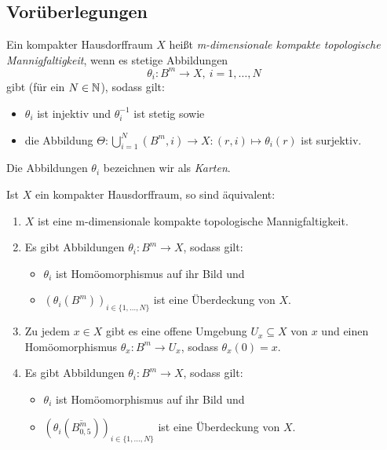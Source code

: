 \subsection{Vorüberlegungen}

\begin{defn}\label{defn:TopMan}
Ein kompakter Hausdorffraum $X$ heißt \emph{m-dimensionale kompakte topologische Mannigfaltigkeit}, wenn es stetige Abbildungen
\[ \theta_i: B^m \to X, ~i = 1, \dots, N \]
gibt (für ein $N \in \mathbb{N}$), sodass gilt:
\begin{itemize}
	\item $\theta_i$ ist injektiv und $\theta_i^{-1}$ ist stetig sowie
	\item die Abbildung $\Theta: \bigcup_{i=1}^N(B^m,i) \to X: (r,i) \mapsto \theta_i(r)$ ist surjektiv.
\end{itemize}
Die Abbildungen $\theta_i$ bezeichnen wir als \emph{Karten}.
\end{defn}

\begin{prop}\label{prop:topManAlt}
Ist $X$ ein kompakter Hausdorffraum, so sind äquivalent:
\begin{enumerate}
	\item \label{prop:topManAlt:is}
		$X$ ist eine m-dimensionale kompakte topologische Mannigfaltigkeit.
	\item \label{prop:topManAlt:endl}
		Es gibt Abbildungen $\theta_i: B^m \to X$, sodass gilt:
		\begin{itemize}
			\item $\theta_i$ ist Homöomorphismus auf ihr Bild und
			\item $(\theta_i(B^m))_{i\in\{1,\dots,N\}}$ ist eine Überdeckung von $X$.
		\end{itemize}	\item \label{prop:topManAlt:pkt}
		Zu jedem $x \in X$ gibt es eine offene Umgebung $U_x \subseteq X$ von $x$ und einen Homöomorphismus $\theta_x: B^m \to U_x$, sodass $\theta_x(0) = x$.
	\item  \label{prop:topManAlt:abg}
		Es gibt Abbildungen $\theta_i: B^m \to X$, sodass gilt:
		\begin{itemize}
			\item $\theta_i$ ist Homöomorphismus auf ihr Bild und
			\item $(\theta_i(\overline{B_{0,5}^m}))_{i\in\{1,\dots,N\}}$ ist eine Überdeckung von $X$.
		\end{itemize}
\end{enumerate}
\end{prop}

